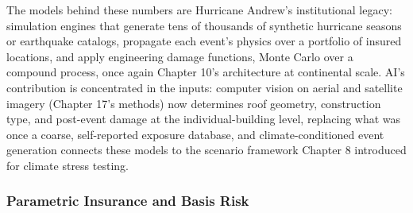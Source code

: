 \documentclass[../ai_in_finance]{subfiles}
\begin{document}
\begin{figure}[htbp]
\centering
\begin{lrbox}{\bookmeasuredbox}
\end{lrbox}
\ifdim\wd\bookmeasuredbox<0.65\linewidth
\setlength{\bookcapwidth}{0.65\linewidth}
\else
\setlength{\bookcapwidth}{\wd\bookmeasuredbox}
\fi
{}
\end{figure}

The models behind these numbers are Hurricane Andrew's institutional legacy: simulation engines that generate tens of thousands of synthetic hurricane seasons or earthquake catalogs, propagate each event's physics over a portfolio of insured locations, and apply engineering damage functions, Monte Carlo over a compound process, once again Chapter 10's architecture at continental scale. AI's contribution is concentrated in the inputs: computer vision on aerial and satellite imagery (Chapter 17's methods) now determines roof geometry, construction type, and post-event damage at the individual-building level, replacing what was once a coarse, self-reported exposure database, and climate-conditioned event generation connects these models to the scenario framework Chapter 8 introduced for climate stress testing.

\subsubsection*{Parametric Insurance and Basis Risk}
\label{sec:ins-parametric}
\end{document}
